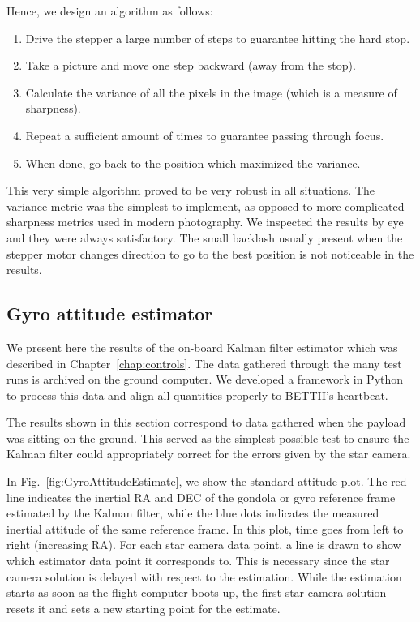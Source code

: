 Hence, we design an algorithm as follows:
\begin{enumerate}
\item Drive the stepper a large number of steps to guarantee hitting the hard stop.
\item Take a picture and move one step backward (away from the stop).
\item Calculate the variance of all the pixels in the image (which is a measure of sharpness).
\item Repeat a sufficient amount of times to guarantee passing through focus.
\item When done, go back to the position which maximized the variance.
\end{enumerate}

This very simple algorithm proved to be very robust in all situations. The variance metric was the simplest to implement, as opposed to more complicated sharpness metrics used in modern photography. We inspected the results by eye and they were always satisfactory. The small backlash usually present when the stepper motor changes direction to go to the best position is not noticeable in the results.

\subsection{Gyro attitude estimator}

We present here the results of the on-board Kalman filter estimator which was described in Chapter~\ref{chap:controls}. The data gathered through the many test runs is archived on the ground computer. We developed a framework in Python to process this data and align all quantities properly to BETTII's heartbeat. 

The results shown in this section correspond to data gathered when the payload was sitting on the ground. This served as the simplest possible test to ensure the Kalman filter could appropriately correct for the errors given by the star camera. 

In Fig.~\ref{fig:GyroAttitudeEstimate}, we show the standard attitude plot. The red line indicates the inertial RA and DEC of the gondola or gyro reference frame estimated by the Kalman filter, while the blue dots indicates the measured inertial attitude of the same reference frame. In this plot, time goes from left to right (increasing RA). For each star camera data point, a line is drawn to show which estimator data point it corresponds to. This is necessary since the star camera solution is delayed with respect to the estimation. While the estimation starts as soon as the flight computer boots up, the first star camera solution resets it and sets a new starting point for the estimate.

